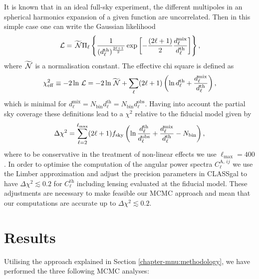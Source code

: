 It is known that in an ideal full-sky experiment, the different multipoles in an spherical harmonics expansion of a given function are uncorrelated. Then in this simple case one can write the Gaussian likelihood
\begin{equation}
\label{Eq:GNC-Gaussian-likelihood}
\,{\mathcal L} = \widetilde{\,{\mathcal N}} \Pi_\ell \left\lbrace \frac{1}{(d_\ell^{\mathrm{th}})^{\frac{2\ell+1}{2}}} \exp \left[ -\frac{(2\ell+1)}{2} \frac{d_\ell^{\mathrm{mix}}}{d_\ell^{\mathrm{th}}}\right] \right\rbrace,                         
\end{equation}
where $\widetilde{\,{\mathcal N}}$ is a normalisation constant. The effective chi square is defined as
\begin{equation}
\label{Eq:GNC-effective-chi2}
\chi^2_{\mathrm{eff}} \equiv -2 \ln \,{\mathcal L} = -2 \ln \widetilde{\,{\mathcal N}} + \sum_\ell (2\ell+1)\left( \ln d_\ell^{\mathrm{th}} + \frac{d_\ell^{\mathrm{mix}}}{d_\ell^{\mathrm{th}}} \right), 
\end{equation}
which is minimal for $d_\ell^{\mathrm{mix}}= N_{\mathrm{bin}} d_\ell^{\mathrm{th}} = N_{\mathrm{bin}} d_\ell^{\mathrm{obs}}$. Having into account the partial sky coverage these definitions lead to a $\chi^2$ relative to the fiducial model given by                     
\begin{equation}
\label{Eq:relative-chi2}
\Delta \chi^2 = \sum_{\ell=2}^{\ell_{\mathrm{max}}} (2\ell+1) f_{\mathrm{sky}} \left( \ln \frac{d_\ell^{\mathrm{th}} }{d_\ell^{\mathrm{obs}}} + \frac{d_\ell^{\mathrm{mix}}}{d_\ell^{\mathrm{th}}} - N_{\mathrm{bin}} \right),
\end{equation}                           
where to be conservative in the treatment of non-linear effects we use $\ell_{\mathrm{max}}=400$. In order to optimise the computation of the angular power spectra $C_\ell^{\mathrm{A},\,ij}$ we use the Limber approximation and adjust the precision parameters in CLASSgal to have $\Delta \chi^2 \lesssim 0.2$ for $C_\ell^{\mathrm{th}}$ including lensing evaluated at the fiducial model. These adjustments are necessary to make feasible our MCMC approach and mean that our computations are accurate up to $\Delta \chi^2 \lesssim 0.2$.                              
                                                                      
\section{Results}
\label{chapter-mnu:results}

Utilising the approach explained in Section \ref{chapter-mnu:methodology}, we have performed the three following MCMC  analyses:

